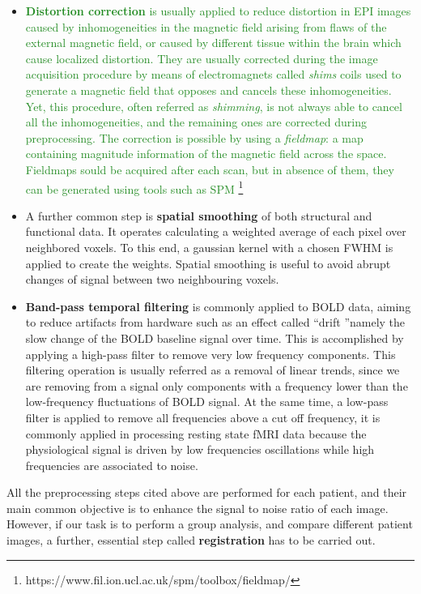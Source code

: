 \documentclass[11pt]{report}
\begin{document}
\begin{itemize}
\item  \textcolor{ForestGreen}{\textbf{Distortion correction} is usually applied to reduce distortion in EPI images caused by inhomogeneities in the magnetic field arising from flaws of the external magnetic field, or caused by different tissue within the brain which cause localized distortion.
They are usually corrected during the image acquisition procedure by means of electromagnets called \emph{shims} coils used to generate a magnetic field that opposes and cancels these inhomogeneities.
Yet, this procedure, often referred as \emph{shimming}, is not always able to cancel all the inhomogeneities, and the remaining ones are corrected during preprocessing.
The correction is possible by using a \emph{fieldmap}: a map containing magnitude information of the magnetic field across the space.
Fieldmaps sould be acquired after each scan, but in absence of them, they can be generated using tools such as SPM
\footnote{https://www.fil.ion.ucl.ac.uk/spm/toolbox/fieldmap/}
}
\item A further common step is \textbf{spatial smoothing} of both structural and functional data. It operates calculating a weighted average of each pixel over neighbored voxels. To this end, a gaussian kernel with a chosen FWHM is applied to create the weights.
Spatial smoothing is useful to avoid abrupt changes of signal between two neighbouring voxels.

\item \textbf{Band-pass temporal filtering} is commonly applied to BOLD data, aiming to reduce artifacts from hardware such as an effect called \textquotedblleft drift \textquotedblright namely the slow change of the BOLD baseline signal over time. This is accomplished by applying a high-pass filter to remove very low frequency components. This filtering operation is usually referred as a removal of linear trends, since we are removing from a signal only components with a frequency lower than the low-frequency fluctuations of BOLD signal.
At the same time, a low-pass filter is applied to remove all frequencies above a cut off frequency, it is commonly applied in processing resting state fMRI data because the physiological signal is driven by low frequencies oscillations while high frequencies are associated to noise.
\end{itemize}

All the preprocessing steps cited above are performed for each patient, and their main common objective is to enhance the signal to noise ratio of each image. However, if our task is to perform a group analysis, and compare different patient images, a further, essential step called \textbf{registration} has to be carried out.
\end{document}
